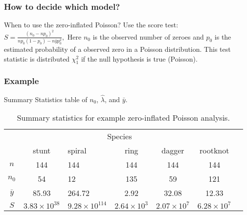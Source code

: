 \documentclass{beamer} %
\theoremstyle{definition} %
\begin{document}
\begin{frame}
\frametitle{How to decide which model?}
When to use the zero-inflated Poisson? Use the score test:\\ \vspace{0.25in}
\pause
$
S = \frac{(n_0 - np_0)^2}{np_0(1-p_0) - n\bar{y}p_0^2},
$
\vspace{0.25in}
\pause
Here $n_0$ is the observed number of zeroes and $p_0$ is the estimated probability of a observed zero in a Poisson distribution. This test statistic is distributed $\chi^2_1$ if the null hypothesis is true (Poisson). 
\end{frame}

\begin{frame}
\frametitle{Example}
Summary Statistics table of $n_0$, $\hat{\lambda}$, and $\bar{y}$.  \\

\begin{table}

\begin{center}
\begin{tabular}{c | c l c  c  c  c  }
\hline
\multicolumn{6}{c}{Species} \\
\cline{1-6}
& stunt & spiral & ring  & dagger & rootknot \\
\hline
$n$& 144 &144  &144 &144 &144  \\
$n_0$ &54  & 12 &135 &59 & 121 \\
$\bar{y}$ &85.93 &264.72  &2.92 & 32.08& 12.33 \\
$S$ &$3.83\times10^{38}$ &$9.28\times10^{114}$ & $2.64\times10^3$ &$2.07\times10^7$ &$6.28\times10^7$  \\
\hline
\end{tabular}
\end{center}
\caption{Summary statistics for example zero-inflated Poisson analysis. }
 \label{tab:table_zip_data}
\end{table}

\end{frame}
\end{document}
